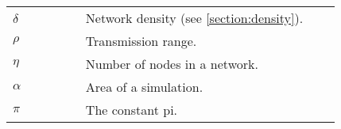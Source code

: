 

\begin{listasimb}

\begin{longtable}{p{0.2\linewidth}p{0.7\linewidth}}
$\delta$ & Network density (see \autoref{section:density}).\\
$\rho$ & Transmission range.\\
$\eta$ & Number of nodes in a network.\\
$\alpha$ & Area of a simulation.\\
$\pi$ & The constant pi.\\
\end{longtable}

\end{listasimb}

